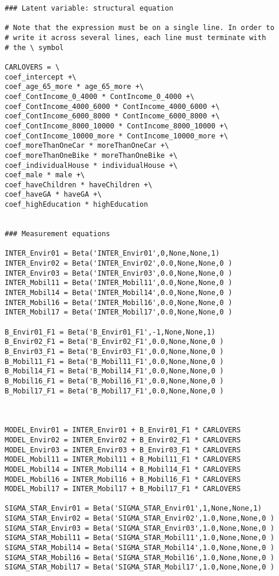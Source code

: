 \documentclass[12pt,a4paper]{article}
\begin{document}
\begin{lstlisting}[style=numbers]
### Latent variable: structural equation

# Note that the expression must be on a single line. In order to 
# write it across several lines, each line must terminate with 
# the \ symbol

CARLOVERS = \
coef_intercept +\
coef_age_65_more * age_65_more +\
coef_ContIncome_0_4000 * ContIncome_0_4000 +\
coef_ContIncome_4000_6000 * ContIncome_4000_6000 +\
coef_ContIncome_6000_8000 * ContIncome_6000_8000 +\
coef_ContIncome_8000_10000 * ContIncome_8000_10000 +\
coef_ContIncome_10000_more * ContIncome_10000_more +\
coef_moreThanOneCar * moreThanOneCar +\
coef_moreThanOneBike * moreThanOneBike +\
coef_individualHouse * individualHouse +\
coef_male * male +\
coef_haveChildren * haveChildren +\
coef_haveGA * haveGA +\
coef_highEducation * highEducation


### Measurement equations

INTER_Envir01 = Beta('INTER_Envir01',0,None,None,1)
INTER_Envir02 = Beta('INTER_Envir02',0.0,None,None,0 )
INTER_Envir03 = Beta('INTER_Envir03',0.0,None,None,0 )
INTER_Mobil11 = Beta('INTER_Mobil11',0.0,None,None,0 )
INTER_Mobil14 = Beta('INTER_Mobil14',0.0,None,None,0 )
INTER_Mobil16 = Beta('INTER_Mobil16',0.0,None,None,0 )
INTER_Mobil17 = Beta('INTER_Mobil17',0.0,None,None,0 )

B_Envir01_F1 = Beta('B_Envir01_F1',-1,None,None,1)
B_Envir02_F1 = Beta('B_Envir02_F1',0.0,None,None,0 )
B_Envir03_F1 = Beta('B_Envir03_F1',0.0,None,None,0 )
B_Mobil11_F1 = Beta('B_Mobil11_F1',0.0,None,None,0 )
B_Mobil14_F1 = Beta('B_Mobil14_F1',0.0,None,None,0 )
B_Mobil16_F1 = Beta('B_Mobil16_F1',0.0,None,None,0 )
B_Mobil17_F1 = Beta('B_Mobil17_F1',0.0,None,None,0 )



MODEL_Envir01 = INTER_Envir01 + B_Envir01_F1 * CARLOVERS
MODEL_Envir02 = INTER_Envir02 + B_Envir02_F1 * CARLOVERS
MODEL_Envir03 = INTER_Envir03 + B_Envir03_F1 * CARLOVERS
MODEL_Mobil11 = INTER_Mobil11 + B_Mobil11_F1 * CARLOVERS
MODEL_Mobil14 = INTER_Mobil14 + B_Mobil14_F1 * CARLOVERS
MODEL_Mobil16 = INTER_Mobil16 + B_Mobil16_F1 * CARLOVERS
MODEL_Mobil17 = INTER_Mobil17 + B_Mobil17_F1 * CARLOVERS

SIGMA_STAR_Envir01 = Beta('SIGMA_STAR_Envir01',1,None,None,1)
SIGMA_STAR_Envir02 = Beta('SIGMA_STAR_Envir02',1.0,None,None,0 )
SIGMA_STAR_Envir03 = Beta('SIGMA_STAR_Envir03',1.0,None,None,0 )
SIGMA_STAR_Mobil11 = Beta('SIGMA_STAR_Mobil11',1.0,None,None,0 )
SIGMA_STAR_Mobil14 = Beta('SIGMA_STAR_Mobil14',1.0,None,None,0 )
SIGMA_STAR_Mobil16 = Beta('SIGMA_STAR_Mobil16',1.0,None,None,0 )
SIGMA_STAR_Mobil17 = Beta('SIGMA_STAR_Mobil17',1.0,None,None,0 )


\end{lstlisting}
\end{document}
